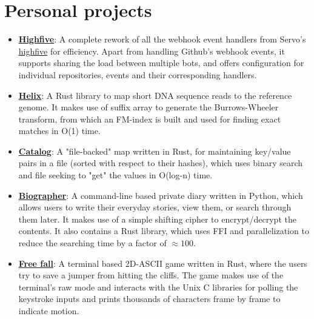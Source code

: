 \documentclass[11pt,a4paper,sans]{moderncv}        %
\newcommand\chref[3][linky]{\href{#2}{\color{#1}#3}}
\begin{document}
\section{Personal projects}
\begin{itemize}
\item \textbf{\chref{https://github.com/servo-automation/highfive}{Highfive}}: A complete rework of all the webhook event handlers from Servo's \chref{https://github.com/servo/highfive}{highfive} for efficiency. Apart from handling Github's webhook events, it supports sharing the load between multiple bots, and offers configuration for individual repositories, events and their corresponding handlers.
\item \textbf{\chref{https://github.com/Wafflespeanut/rust-helix}{Helix}}: A Rust library to map short DNA sequence reads to the reference genome. It makes use of suffix array to generate the Burrows-Wheeler transform, from which an FM-index is built and used for finding exact matches in O(1) time.
\item \textbf{\chref{https://github.com/Wafflespeanut/rust-catalog}{Catalog}}: A "file-backed" map written in Rust, for maintaining key/value pairs in a file (sorted with respect to their hashes), which uses binary search and file seeking to "get" the values in O(log-n) time.
\item \textbf{\chref{https://github.com/Wafflespeanut/biographer}{Biographer}}: A command-line based private diary written in Python, which allows users to write their everyday stories, view them, or search through them later. It makes use of a simple shifting cipher to encrypt/decrypt the contents. It also contains a Rust library, which uses FFI and parallelization to reduce the searching time by a factor of $\approx 100$.
\item \textbf{\chref{https://github.com/Wafflespeanut/free-fall}{Free fall}}: A terminal based 2D-ASCII game written in Rust, where the users try to save a jumper from hitting the cliffs. The game makes use of the terminal's raw mode and interacts with the Unix C libraries for polling the keystroke inputs and prints thousands of characters frame by frame to indicate motion.
\end{itemize}

\end{document}
